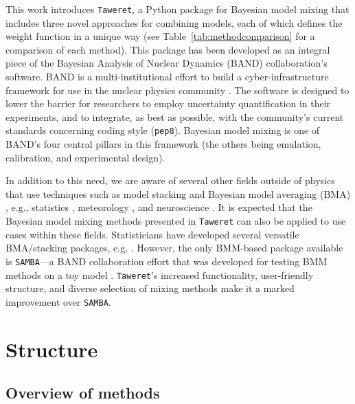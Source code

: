 \documentclass[10pt, preprint,aps,prc,floatfix,
tightenlines,
nofootinbib,superscriptaddress]{revtex4-2}
\begin{document}
This work introduces \texttt{Taweret}, a Python package for Bayesian model mixing that includes three novel approaches for combining models, each of which defines the weight function in a unique way (see Table~\ref{tab:methodcomparison} for a comparison of each method). This package has been developed as an integral piece of the Bayesian Analysis of Nuclear Dynamics (BAND) collaboration's software. BAND is a multi-institutional effort to build a cyber-infrastructure framework for use in the nuclear physics community \cite{Phillips:2020dmw, bandframework}. The software is designed to lower the barrier for researchers to employ uncertainty quantification in their experiments, and to integrate, as best as possible, with the community's current standards concerning coding style (\texttt{pep8}). Bayesian model mixing is one of BAND's four central pillars in this framework (the others being emulation, calibration, and experimental design).

In addition to this need, we are aware of several other fields outside of physics that use techniques such as model stacking and Bayesian model averaging (BMA) \cite{Fragoso2018}, e.g., statistics \cite{Yao2018, Yao2022}, meteorology \cite{Sloughter2007}, and neuroscience \cite{FitzGerald2014}. It is expected that the Bayesian model mixing methods presented in \texttt{Taweret} can also be applied to use cases within these fields. 
Statisticians have developed several versatile BMA/stacking packages, e.g. \cite{loo, BMA_R}. However, the only BMM-based package available is \texttt{SAMBA}---a BAND collaboration effort that was developed for testing BMM methods on a toy model \cite{Semposki:2022gcp}. \texttt{Taweret}'s increased functionality, user-friendly structure, and diverse selection of mixing methods make it a marked improvement over \texttt{SAMBA}. 

\section{Structure}

\subsection{Overview of methods}
\end{document}
